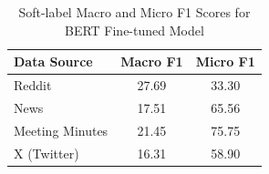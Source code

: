 \begin{table}[htbp]
\centering
\begin{tabular}{lcc}
\toprule
Data Source & Macro F1 & Micro F1 \\
\midrule
Reddit & 27.69 & 33.30 \\
News & 17.51 & 65.56 \\
Meeting Minutes & 21.45 & 75.75 \\
X (Twitter) & 16.31 & 58.90 \\
\bottomrule
\end{tabular}
\centering\caption{Soft-label Macro and Micro F1 Scores for BERT Fine-tuned Model}
\label{tab:bert_macro_micro}
\end{table}